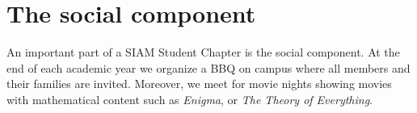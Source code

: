 \documentclass{article}
\begin{document}
 \section*{The social component}
 An important part of a SIAM Student Chapter is the social component. At the end of each academic year we organize a BBQ on campus where all members and their families are invited. Moreover, we meet for movie nights showing movies with mathematical content such as \textit{Enigma}, or \textit{The Theory of Everything}. 
 
 
\end{document}
